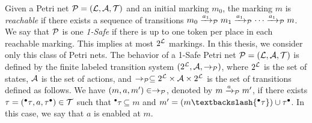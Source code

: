 Given a Petri net $\mathcal{P}=(\mathcal{L},\mathcal{A},\mathcal{T})$ and an initial marking $m_0$, the marking $m$
is \emph{reachable} if there exists a sequence of transitions $m_0\xrightarrow{a_1}_{\mathcal{P}}m_1
\xrightarrow{a_1}_{\mathcal{P}}\cdots\xrightarrow{a_1}_{\mathcal{P}}m$. We say that $\mathcal{P}$ is one \emph{1-Safe}
if there is up to one token per place in each reachable marking. This implies at most
$2^{\mathcal{L}}$ markings. In this thesis, we consider only this class of Petri nets.
The behavior of a 1-Safe Petri net  $\mathcal{P}=(\mathcal{L},\mathcal{A},\mathcal{T})$ is defined by the finite
labeled transition system $(2^{\mathcal{L}},\mathcal{A},\to_{\mathcal{P}})$, where $2^{\mathcal{L}}$ is the set of
states, $\mathcal{A}$ is the set of actions, and $\to_{\mathcal{P}}\subseteq 2^{\mathcal{L}}\times\mathcal{A}\times
2^{\mathcal{L}}$ is the set of transitions defined as follows. We have $(m,a,m')\in\to_{\mathcal{P}}$, 
denoted by $m\xrightarrow{a}_{\mathcal{P}}m'$, if there exists $\tau=({^\bullet\tau},a,{\tau^\bullet })
  \in\mathcal{T}$ such that ${^\bullet\tau}\subseteq m$ and $m'=(m\textbackslash{^\bullet\tau})
  \cup{\tau^\bullet }$.
In this case, we say that $a$ is enabled at $m$.


